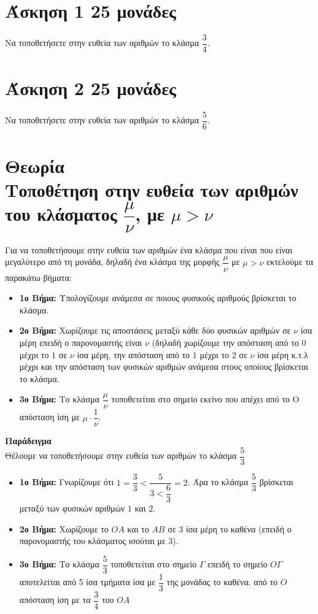 \documentclass[a4paper,10pt]{report}
\begin{document}
\section*{Άσκηση 1  \hfill \small{25 μονάδες}}
Να τοποθετήσετε στην ευθεία των αριθμών το κλάσμα $\dfrac{3}{4}$.

\section*{Άσκηση 2  \hfill \small{25 μονάδες}}
Να τοποθετήσετε στην ευθεία των αριθμών το κλάσμα $\dfrac{5}{6}$.


\section*{Θεωρία\\Τοποθέτηση στην ευθεία των αριθμών του κλάσματος $\dfrac{μ}{ν}$, με $μ>ν$ \hfill \small{}}
Για να τοποθετήσουμε στην ευθεία των αριθμών ένα κλάσμα που είναι που είναι μεγαλύτερο από τη μονάδα, δηλαδή 
ένα κλάσμα της μορφής $\dfrac{μ}{ν}$ με $μ>ν$ εκτελούμε τα παρακάτω βήματα:
\begin{itemize}
 \item \textbf{1ο Βήμα:} Υπολογίζουμε ανάμεσα σε ποιους φυσικούς αριθμούς βρίσκεται το κλάσμα.
 \item \textbf{2ο Βήμα:} Χωρίζουμε τις αποστάσεις μεταξύ κάθε δύο φυσικών αριθμών 
              σε $ν$ ίσα μέρη επειδή ο παρονομαστής είναι $ν$ (δηλαδή χωρίζουμε την απόσταση 
              από το $0$ μέχρι το $1$ σε $ν$ ίσα μέρη, την απόσταση 
              από το $1$ μέχρι το $2$ σε $ν$ ίσα μέρη κ.τ.λ μέχρι και την απόσταση των φυσικών αριθμών 
              ανάμεσα στους οποίους βρίσκεται το κλάσμα.
 \item \textbf{3ο Βήμα:} Το κλάσμα $\dfrac{μ}{ν}$ τοποθετείται στο σημείο εκείνο που απέχει 
               από το Ο απόσταση ίση με $μ\cdot \dfrac{1}{ν}$. 
\end{itemize}

\textbf{Παράδειγμα} \\
Θέλουμε να τοποθετήσουμε στην ευθεία των αριθμών το κλάσμα $\dfrac{5}{3}$
\begin{itemize}
\item \textbf{1ο Βήμα:} Γνωρίζουμε ότι $1=\dfrac{3}{3}<\dfrac{5}{3<\dfrac{6}{3}}=2$.
      Άρα  το κλάσμα $\dfrac{5}{3}$ βρίσκεται 
      μεταξύ των φυσικών αριθμών $1$ και $2$.
 \item \textbf{2ο Βήμα:} Χωρίζουμε το $ΟΑ$ και το $ΑΒ$ σε 3 ίσα μέρη το καθένα 
 (επειδή ο παρονομαστής του κλάσματος ισούται με 3).
 \item \textbf{3ο Βήμα:} Το κλάσμα $\dfrac{5}{3}$ τοποθετείται στο σημείο $Γ$ επειδή το σημείο $ΟΓ$ αποτελείται 
        από 5 ίσα τμήματα ίσα με $\dfrac{1}{3}$ της μονάδας το καθένα.
       από το $Ο$ απόσταση ίση με τα $\dfrac{3}{4}$ του $ΟΑ$ 
\end{itemize}
\end{document}
